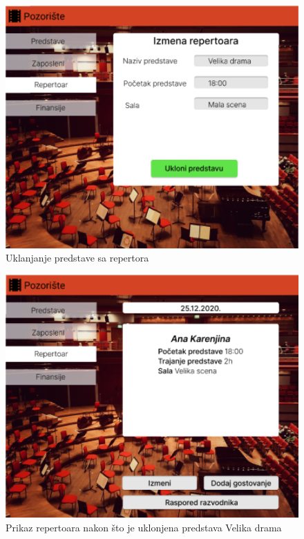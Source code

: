 \documentclass[a4paper]{article}
\begin{document}
\begin{figure}[H]
  \begin{center}
    \includegraphics[width=130mm]{../images/ui_uklanjanje_predstave1.png}
  \end{center}
  \caption{Uklanjanje predstave sa repertora}
  \label{uklanjanje_predstave}
\end{figure}

\begin{figure}[H]
  \begin{center}
    \includegraphics[width=130mm]{../images/ui_uklanjanje_predstave2.png}
  \end{center}
  \caption{Prikaz repertoara nakon što je uklonjena predstava Velika drama}
  \label{uklonjena_je_predstava}
\end{figure}
\end{document}
